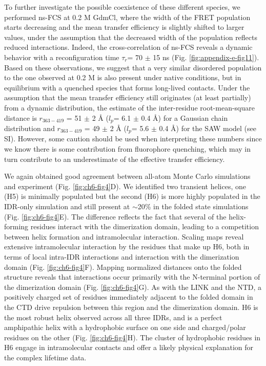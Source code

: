 \documentclass[../main.tex]{subfiles}
\begin{document}
        To further investigate the possible coexistence of these different species, we performed ns-FCS at 0.2 M GdmCl, where the width of the FRET population starts decreasing and the mean transfer efficiency is slightly shifted to larger values, under the assumption that the decreased width of the population reflects reduced interactions. Indeed, the cross-correlation of ns-FCS reveals a dynamic behavior with a reconfiguration time $\tau _r$= 70 $\pm$ 15 ns (Fig. \ref{fig:appendix-e-fig11}). Based on these observations, we suggest that a very similar disordered population to the one observed at 0.2 M is also present under native conditions, but in equilibrium with a quenched species that forms long-lived contacts. Under the assumption that the mean transfer efficiency still originates (at least partially) from a dynamic distribution, the estimate of the inter-residue root-mean-square distance is $r_{363-419}$ = 51 $\pm$ 2 \AA{} ($l_p$= 6.1 $\pm$ 0.4 \AA{}) for a Gaussian chain distribution and $r_{363-419}$ = 49 $\pm$ 2 \AA{} ($l_p$= 5.6 $\pm$ 0.4 \AA{}) for the SAW model (see SI). However, some caution should be used when interpreting these numbers since we know there is some contribution from fluorophore quenching, which may in turn contribute to an underestimate of the effective transfer efficiency\cite{Zosel2017-ao}.

        We again obtained good agreement between all-atom Monte Carlo simulations and experiment (Fig. \ref{fig:ch6-fig4}D). We identified two transient helices, one (H5) is minimally populated but the second (H6) is more highly populated in the IDR-only simulation and still present at $\sim$20\% in the folded state simulations (Fig. \ref{fig:ch6-fig4}E). The difference reflects the fact that several of the helix-forming residues interact with the dimerization domain, leading to a competition between helix formation and intramolecular interaction. Scaling maps reveal extensive intramolecular interaction by the residues that make up H6, both in terms of local intra-IDR interactions and interaction with the dimerization domain (Fig. \ref{fig:ch6-fig4}F). Mapping normalized distances onto the folded structure reveals that interactions occur primarily with the N-terminal portion of the dimerization domain (Fig. \ref{fig:ch6-fig4}G). As with the LINK and the NTD, a positively charged set of residues immediately adjacent to the folded domain in the CTD drive repulsion between this region and the dimerization domain. H6 is the most robust helix observed across all three IDRs, and is a perfect amphipathic helix with a hydrophobic surface on one side and charged/polar residues on the other (Fig. \ref{fig:ch6-fig4}H). The cluster of hydrophobic residues in H6 engage in intramolecular contacts and offer a likely physical explanation for the complex lifetime data.
\end{document}
